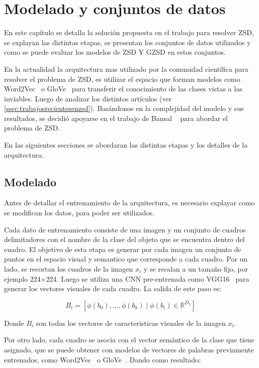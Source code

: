 \chapter{Modelado y conjuntos de datos}\label{cap:arquitecturayconjuntosdedatos}

En este capítulo se detalla la solución propuesta en el trabajo para resolver ZSD, se explayan las distintas etapas, se presentan los conjuntos de datos utilizados y como se puede evaluar los modelos de ZSD Y GZSD en estos conjuntos.

En la actualidad la arquitectura mas utilizado por la comunidad científica para resolver el problema de ZSD, es utilizar el espacio que forman modelos como Word2Vec~\cite{mikolov2013distributed} o GloVe~\cite{pennington2014glove} para transferir el conocimiento de las clases vistas a las inviables. Luego de analizar los distintos artículos (ver \autoref{ssec:trabajosrecientesenzsd}). Basándonos en la complejidad del modelo y sus resultados, se decidió apoyarse en el trabajo de Bansal \etal~\cite{bansal2018zero} para abordar el problema de ZSD.

En las siguientes secciones se abordaran las distintas etapas y los detalles de la arquitectura.


\section{Modelado}\label{ssec:preprocesamiento} 
Antes de detallar el entrenamiento de la arquitectura, es necesario explayar como se modifican los datos, para poder ser utilizados.

Cada dato de entrenamiento consiste de una imagen y un conjunto de cuadros delimitadores con el nombre de la clase del objeto que se encuentra dentro del cuadro. El objetivo de esta etapa es generar por cada imagen un conjunto de puntos en el espacio visual y semantico que corresponde a cada cuadro. Por un lado, se recortan los cuadros de la imagen $x_i$ y se recalan a un tamaño fijo, por ejemplo 224$\times$224. Luego se utiliza una CNN pre-entrenada como VGG16~\cite{simonyan2014very} para generar los vectores visuales de cada cuadro. La salida de este paso es:

\[B_i = [\phi(b_0),...,\phi(b_k) \mid \phi(b_i) \in \mathbb{R}^{D_1}]\] 

Donde $B_i$ son todas los vectores de caracteristicas visuales de la imagen $x_i$.

Por otro lado, cada cuadro se asocia con el vector semántico de la clase que tiene asignado, que se puede obtener con modelos de vectores de palabras previamente entrenados, como Word2Vec~\cite{mikolov2013distributed} o GloVe~\cite{pennington2014glove}. Dando como resultado:

